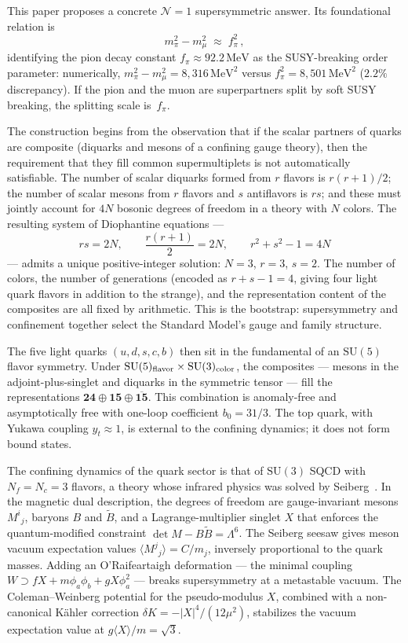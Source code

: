 \documentclass[12pt,a4paper]{article}
\newcommand{\MeV}{\,\text{MeV}}
\newcommand{\fpi}{f_\pi}
\begin{document}
This paper proposes a concrete $\mathcal{N}=1$ supersymmetric answer.
Its foundational relation is
\begin{equation}
m_\pi^2 - m_\mu^2 \;\approx\; \fpi^2\,,
\end{equation}
identifying the pion decay constant $\fpi \approx 92.2\MeV$ as the
SUSY-breaking order parameter: numerically,
$m_\pi^2 - m_\mu^2 = 8{,}316\MeV^2$ versus
$\fpi^2 = 8{,}501\MeV^2$ ($2.2\%$ discrepancy). If the pion and the
muon are superpartners split by soft SUSY breaking, the splitting
scale is~$\fpi$.

The construction begins from the observation that if the scalar partners
of quarks are composite (diquarks and mesons of a confining gauge
theory), then the requirement that they fill common supermultiplets is
not automatically satisfiable. The number of scalar diquarks formed from
$r$ flavors is $r(r+1)/2$; the number of scalar mesons from $r$ flavors
and $s$ antiflavors is $rs$; and these must jointly account for $4N$
bosonic degrees of freedom in a theory with $N$ colors. The resulting
system of Diophantine equations ---
$$rs = 2N, \qquad \frac{r(r+1)}{2} = 2N, \qquad r^2 + s^2 - 1 = 4N$$
--- admits a unique positive-integer solution: $N=3$, $r=3$, $s=2$. The
number of colors, the number of generations (encoded as $r + s - 1 = 4$,
giving four light quark flavors in addition to the strange), and the
representation content of the composites are all fixed by arithmetic.
This is the bootstrap: supersymmetry and confinement together select the
Standard Model's gauge and family structure.

The five light quarks $(u, d, s, c, b)$ then sit in the fundamental of
an $\mathrm{SU}(5)$ flavor symmetry. Under $\mathrm{SU}(5)_{\rm
flavor} \times \mathrm{SU}(3)_{\rm color}$, the composites --- mesons
in the adjoint-plus-singlet and diquarks in the symmetric tensor ---
fill the representations $\mathbf{24} \oplus \mathbf{15} \oplus
\overline{\mathbf{15}}$. This combination is anomaly-free and
asymptotically free with one-loop coefficient $b_0 = 31/3$. The top
quark, with Yukawa coupling $y_t \approx 1$, is external to the
confining dynamics; it does not form bound states.

The confining dynamics of the quark sector is that of $\mathrm{SU}(3)$
SQCD with $N_f = N_c = 3$ flavors, a theory whose infrared physics was
solved by Seiberg~\cite{Seiberg1995}. In the magnetic dual description, the degrees of
freedom are gauge-invariant mesons $M^i{}_j$, baryons $B$ and
$\tilde{B}$, and a Lagrange-multiplier singlet $X$ that enforces the
quantum-modified constraint $\det M - B\tilde{B} = \Lambda^6$. The
Seiberg seesaw gives meson vacuum expectation values $\langle M^j{}_j
\rangle = C/m_j$, inversely proportional to the quark masses. Adding an
O'Raifeartaigh deformation --- the minimal coupling $W \supset fX + m
\phi_a \phi_b + gX\phi_a^2$ --- breaks supersymmetry at a metastable
vacuum. The Coleman--Weinberg potential for the pseudo-modulus $X$,
combined with a non-canonical K\"ahler correction $\delta K = -|X|^4
/(12\mu^2)$, stabilizes the vacuum expectation value at $g\langle X
\rangle / m = \sqrt{3}$.
\end{document}
